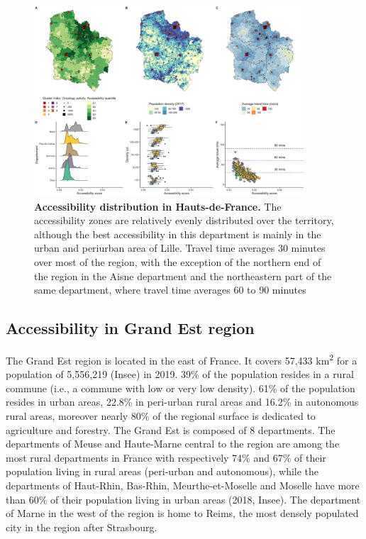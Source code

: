 \begin{figure}[H]
    \includegraphics[width=0.9\textwidth]{images/camion/region_accessibility/accessibility_Hauts-de-France.png}
    \centering
    \caption{ \textbf{Accessibility distribution in Hauts-de-France.} The
        accessibility zones are relatively evenly distributed over the
        territory, although the best accessibility in this department is mainly
        in the urban and periurban area of Lille. Travel time averages 30
        minutes over most of the region, with the exception of the northern end
        of the region in the Aisne department and the northeastern part of the
        same department, where travel time averages 60 to 90 minutes }
\end{figure}

\subsection*{Accessibility in Grand Est region}

The Grand Est region is located in the east of France. It covers 57,433
km\textsuperscript{2} for a population of 5,556,219 (Insee) in 2019. 39\% of the
population resides in a rural commune (i.e., a commune with low or very low
density). 61\% of the population resides in urban areas, 22.8\% in peri-urban
rural areas and 16.2\% in autonomous rural areas, moreover nearly 80\% of the
regional surface is dedicated to agriculture and forestry. The Grand Est is
composed of 8 departments. The departments of Meuse and Haute-Marne central to
the region are among the most rural departments in France with respectively 74\%
and 67\% of their population living in rural areas (peri-urban and autonomous),
while the departments of Haut-Rhin, Bas-Rhin, Meurthe-et-Moselle and Moselle
have more than 60\% of their population living in urban areas (2018, Insee). The
department of Marne in the west of the region is home to Reims, the most densely
populated city in the region after Strasbourg.

